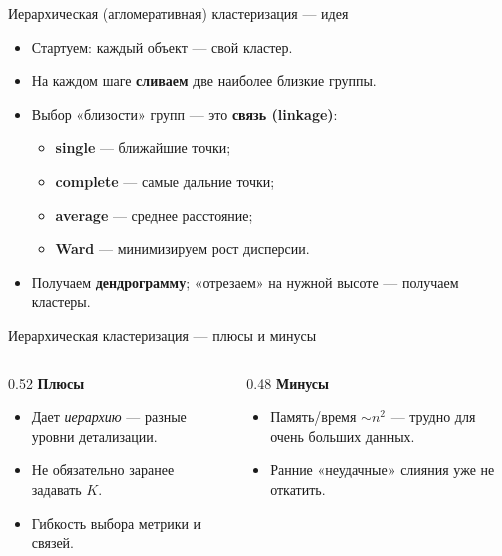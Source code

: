 \documentclass[aspectratio=169]{beamer}
\newcommand{\term}[1]{\textbf{#1}}
\begin{document}
\begin{frame}{Иерархическая (агломеративная) кластеризация — идея}
	\begin{itemize}
		\item Стартуем: каждый объект — свой кластер.
		\item На каждом шаге \term{сливаем} две наиболее близкие группы.
		\item Выбор «близости» групп — это \term{связь (linkage)}:
		      \begin{itemize}
			      \item \term{single} — ближайшие точки;
			      \item \term{complete} — самые дальние точки;
			      \item \term{average} — среднее расстояние;
			      \item \term{Ward} — минимизируем рост дисперсии.
		      \end{itemize}
		\item Получаем \term{дендрограмму}; «отрезаем» на нужной высоте — получаем кластеры.
	\end{itemize}
\end{frame}

\begin{frame}{Иерархическая кластеризация — плюсы и минусы}
	\begin{columns}[T]
		\begin{column}{0.52\textwidth}
			\textbf{Плюсы}
			\begin{itemize}
				\item Дает \emph{иерархию} — разные уровни детализации.
				\item Не обязательно заранее задавать \(K\).
				\item Гибкость выбора метрики и связей.
			\end{itemize}
		\end{column}
		\begin{column}{0.48\textwidth}
			\textbf{Минусы}
			\begin{itemize}
				\item Память/время \(\sim n^2\) — трудно для очень больших данных.
				\item Ранние «неудачные» слияния уже не откатить.
			\end{itemize}
		\end{column}
	\end{columns}
\end{frame}
\end{document}

